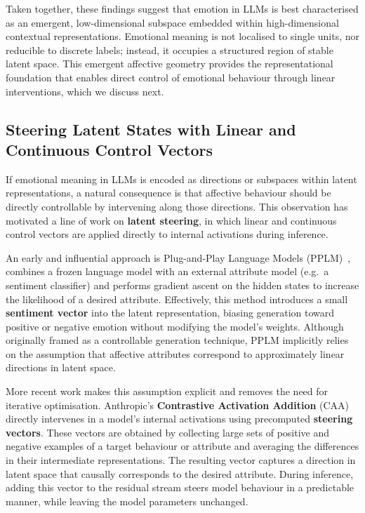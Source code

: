 \documentclass[12pt,twoside]{report}
\begin{document}
Taken together, these findings suggest that emotion in LLMs is best characterised as an emergent, low-dimensional subspace embedded within high-dimensional contextual representations. Emotional meaning is not localised to single units, nor reducible to discrete labels; instead, it occupies a structured region of stable latent space. This emergent affective geometry provides the representational foundation that enables direct control of emotional behaviour through linear interventions, which we discuss next.

\subsection{Steering Latent States with Linear and Continuous Control Vectors}

If emotional meaning in LLMs is encoded as directions or subspaces within latent representations, a natural consequence is that affective behaviour should be directly controllable by intervening along those directions. This observation has motivated a line of work on \textbf{latent steering}, in which linear and continuous control vectors are applied directly to internal activations during inference.

An early and influential approach is Plug-and-Play Language Models (PPLM)~\cite{dathathri2020plugplaylanguagemodels}, combines a frozen language model with an external attribute model (e.g.\ a sentiment classifier) and performs gradient ascent on the hidden states to increase the likelihood of a desired attribute. Effectively, this method introduces a small \textbf{sentiment vector} into the latent representation, biasing generation toward positive or negative emotion without modifying the model’s weights. Although originally framed as a controllable generation technique, PPLM implicitly relies on the assumption that affective attributes correspond to approximately linear directions in latent space.

More recent work makes this assumption explicit and removes the need for iterative optimisation. Anthropic’s \textbf{Contrastive Activation Addition} (CAA)~\cite{caa} directly intervenes in a model’s internal activations using precomputed \textbf{steering vectors}. These vectors are obtained by collecting large sets of positive and negative examples of a target behaviour or attribute and averaging the differences in their intermediate representations. The resulting vector captures a direction in latent space that causally corresponds to the desired attribute. During inference, adding this vector to the residual stream steers model behaviour in a predictable manner, while leaving the model parameters unchanged.
\end{document}
